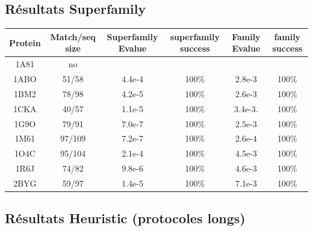 \documentclass[a4paper,12pt]{article}
\begin{document}
    
    \clearpage



   \subsection{ Résultats Superfamily}


    \begin{table}[h]
           \raggedleft

      \begin{tabular}{|c|c|c|c|c|c|}

        \hline
        Protein & Match/seq size & Superfamily Evalue & superfamily success & Family Evalue & family success\\
        \hline
        1A81 & no & & & & \\
        1ABO & 51/58 & 4.4e-4 & 100\% & 2.8e-3 & 100\% \\
        1BM2 & 78/98 & 4.2e-5 & 100\% & 2.6e-3 & 100\% \\
        1CKA & 40/57 & 1.1e-5 & 100\% & 3.4e-3. & 100\% \\
        1G9O & 79/91 & 7.0e-7 & 100\% & 2.5e-3 & 100\%  \\
        1M61 & 97/109 & 7.2e-7 & 100\% & 2.6e-4 &  100\% \\
        1O4C & 95/104 & 2.1e-4 & 100\% & 4.5e-3 &  100\% \\
        1R6J & 74/82 & 9.8e-6 & 100\% & 4.6e-3 &  100\% \\
        2BYG & 59/97 & 1.4e-5 & 100\% & 7.1e-3 &  100\% \\

        \hline


 \end{tabular}      


 \label{tab_echec2BYG__1}       
\end{table}



    \clearpage



   \subsection{ Résultats Heuristic (protocoles longs)}
\end{document}
